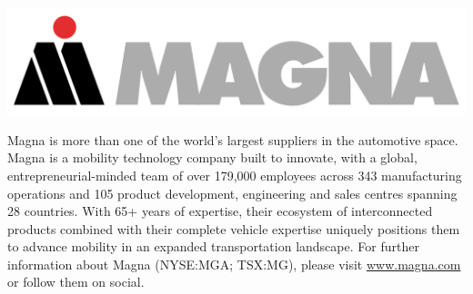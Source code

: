 \documentclass[
	openany, %
	parskip=full, %
	12pt, %
	a4paper, %
]{conferencebooklet} %
\begin{document}
\begin{multicols*}{2}
    \includegraphics[width=0.8\linewidth]{logos/magna.png} 
    
    Magna is more than one of the world’s largest suppliers in the automotive space. Magna is a mobility technology company built to innovate, with a global, entrepreneurial-minded team of over 179,000 employees across 343 manufacturing operations and 105 product development, engineering and sales centres spanning 28 countries. With 65+ years of expertise, their ecosystem of interconnected products combined with their complete vehicle expertise uniquely positions them to advance mobility in an expanded transportation landscape. For further information about Magna (NYSE:MGA; TSX:MG), please visit \url{www.magna.com} or follow them on social.
    
\end{multicols*}

\end{document}
